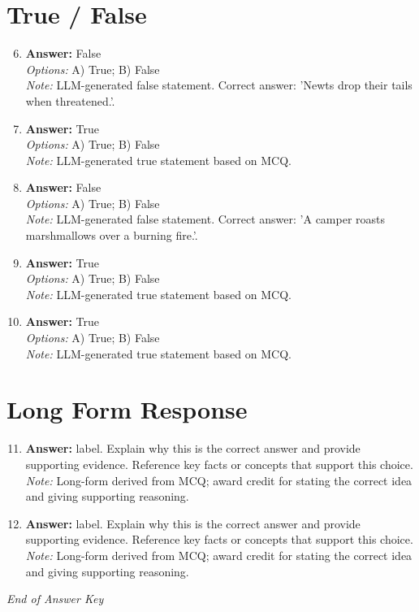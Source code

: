 \documentclass[12pt]{article}
\begin{document}
\section*{True / False}
\begin{enumerate}[label=\arabic*.]
\setcounter{enumi}{5}
\item \textbf{Answer:} False
\\ \textit{Options:} A) True; B) False
\\ \textit{Note:} LLM-generated false statement. Correct answer: 'Newts drop their tails when threatened.'.
\item \textbf{Answer:} True
\\ \textit{Options:} A) True; B) False
\\ \textit{Note:} LLM-generated true statement based on MCQ.
\item \textbf{Answer:} False
\\ \textit{Options:} A) True; B) False
\\ \textit{Note:} LLM-generated false statement. Correct answer: 'A camper roasts marshmallows over a burning fire.'.
\item \textbf{Answer:} True
\\ \textit{Options:} A) True; B) False
\\ \textit{Note:} LLM-generated true statement based on MCQ.
\item \textbf{Answer:} True
\\ \textit{Options:} A) True; B) False
\\ \textit{Note:} LLM-generated true statement based on MCQ.
\end{enumerate}

\section*{Long Form Response}
\begin{enumerate}[label=\arabic*.]
\setcounter{enumi}{10}
\item \textbf{Answer:} label. Explain why this is the correct answer and provide supporting evidence. Reference key facts or concepts that support this choice.
\\ \textit{Note:} Long-form derived from MCQ; award credit for stating the correct idea and giving supporting reasoning.
\item \textbf{Answer:} label. Explain why this is the correct answer and provide supporting evidence. Reference key facts or concepts that support this choice.
\\ \textit{Note:} Long-form derived from MCQ; award credit for stating the correct idea and giving supporting reasoning.
\end{enumerate}

\vfill
\noindent\textit{End of Answer Key}
\end{document}
